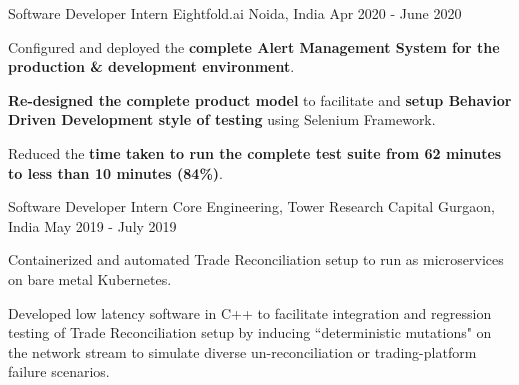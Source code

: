 \begin{cventries}

  \cventry
    {Software Developer Intern} %
    {Eightfold.ai} %
    {Noida, India} %
    {Apr 2020 - June 2020} %
    {
      \begin{cvitems} %
        \item {Configured and deployed the \textbf{complete Alert Management System for the production \& development environment}.}
        \item {\textbf{Re-designed the complete product model} to facilitate and \textbf{setup Behavior Driven Development style of testing} using Selenium Framework.}
        \item {Reduced the \textbf{time taken to run the complete test suite from 62 minutes to less than 10 minutes (84\%)}.}
      \end{cvitems}
    }


  \cventry
    {Software Developer Intern} %
    {Core Engineering, Tower Research Capital} %
    {Gurgaon, India} %
    {May 2019 - July 2019} %
    {
      \begin{cvitems} %
        \item {Containerized and automated Trade Reconciliation setup to run as microservices on bare metal Kubernetes.}
        \item {Developed low latency software in C++ to facilitate integration and regression testing of Trade Reconciliation setup by inducing ``deterministic mutations" on the network stream to simulate diverse un-reconciliation or trading-platform failure scenarios.}
      \end{cvitems}
    }


\end{cventries}
